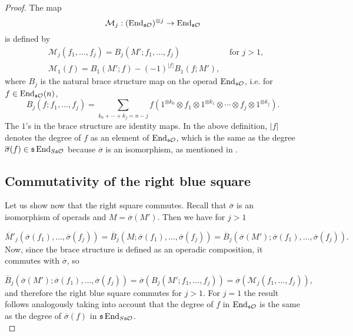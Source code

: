 \documentclass[join.tex]{subfiles}
\begin{document}
\begin{proof}
 The map 
\[\mathcal{M}_j:(\operatorname{End}_{\mathfrak{s}{\mathcal O}})^{\otimes j}\to\operatorname{End}_{\mathfrak{s}{\mathcal O}}\]
is defined by 
\begin{align*}
&\mathcal{M}_j(f_1, \dots, f_j)=B_j(M';f_1,\dots, f_j) &\text{ for }j>1,\\
&\mathcal{M}_1(f)=B_1(M';f)-(-1)^{|f|}B_1(f;M'),
\end{align*}
 where $B_j$ is the natural brace structure map on the operad $\operatorname{End}_{\mathfrak{s}{\mathcal O}}$, i.e. for $f\in\operatorname{End}_{\mathfrak{s}{\mathcal O}}(n)$, 
\[B_j(f;f_1,\dots, f_j)=\sum_{k_0+\cdots+k_j=n-j} f(1^{\otimes k_0}\otimes f_1\otimes 1^{\otimes k_1}\otimes\cdots\otimes f_j\otimes 1^{\otimes k_j}).\]
 The $1$'s in the brace structure are identity maps. In the above definition, $|f|$ denotes the degree of $f$ as an element of $\operatorname{End}_{\mathfrak{s}{\mathcal O}}$, which is the same as the degree $\overline{\sigma}(f)\in \mathfrak{s}\operatorname{End}_{S\mathfrak{s}{\mathcal O}}$ because $\overline{\sigma}$ is an isomorphism, as mentioned in .  %
 \subsection*{Commutativity of the right blue square}
 Let us show now that the right square commutes. Recall that $\overline{\sigma}$ is an isomorphism of operads and $M=\overline{\sigma}(M')$. Then we have for $j>1$
 
 \[\overline{M}'_j(\overline{\sigma}(f_1),\dots,\overline{\sigma}(f_j))=\overline{B}_j(M;\overline{\sigma}(f_1),\dots,\overline{\sigma}(f_j))=\overline{B}_j(\overline{\sigma}(M');\overline{\sigma}(f_1),\dots,\overline{\sigma}(f_j)).\]
 Now, since the brace structure is defined as an operadic composition, it commutes with $\overline{\sigma}$, so
 
 \[\overline{B}_j(\overline{\sigma}(M');\overline{\sigma}(f_1),\dots,\overline{\sigma}(f_j))=\overline{\sigma}(B_j(M';f_1,\dots, f_j))=\overline{\sigma}(\mathcal{M}_j(f_1,\dots, f_j)),\]
 and therefore the right blue square commutes for $j>1$. For $j=1$ the result follows analogously taking into account that the degree of $f$ in $\operatorname{End}_{\mathfrak{s}{\mathcal O}}$ is the same as the degree of $\overline{\sigma}(f)$ in $\mathfrak{s}\operatorname{End}_{S\mathfrak{s}{\mathcal O}}$.\\
 
 




\end{proof}
\end{document}
